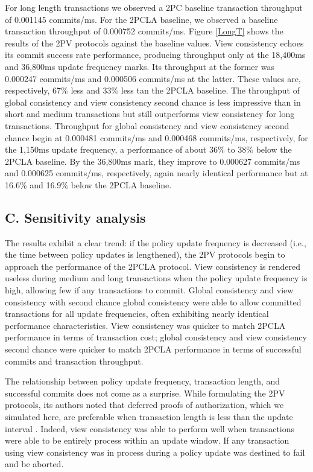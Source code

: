 \documentclass[11pt]{article}
\begin{document}
For long length transactions we observed a 2PC baseline transaction throughput of 0.001145 commits/ms. For the 2PCLA baseline, we observed a baseline transaction throughput of 0.000752 commits/ms. Figure \ref{LongT} shows the results of the 2PV protocols against the baseline values. View consistency echoes its commit success rate performance, producing throughput only at the 18,400ms and 36,800ms update frequency marks. Its throughput at the former was 0.000247 commits/ms and 0.000506 commits/ms at the latter. These values are, respectively, 67\% less and 33\% less tan the 2PCLA baseline. The throughput of global consistency and view consistency second chance is less impressive than in short and medium transactions but still outperforms view consistency for long transactions. Throughput for global consistency and view consistency second chance begin at 0.000481 commits/ms and 0.000468 commits/ms, respectively, for the 1,150ms update frequency, a performance of about 36\% to 38\% below the 2PCLA baseline. By the 36,800ms mark, they improve to 0.000627 commits/ms and 0.000625 commits/ms, respectively, again nearly identical performance but at 16.6\% and 16.9\% below the 2PCLA baseline.
\subsection{C. Sensitivity analysis}
The results exhibit a clear trend: if the policy update frequency is decreased (i.e., the time between policy updates is lengthened), the 2PV protocols begin to approach the performance of the 2PCLA protocol. View consistency is rendered useless during medium and long transactions when the policy update frequency is high, allowing few if any transactions to commit. Global consistency and view consistency with second chance global consistency were able to allow committed transactions for all update frequencies, often exhibiting nearly identical performance characteristics. View consistency was quicker to match 2PCLA performance in terms of transaction cost; global consistency and view consistency second chance were quicker to match 2PCLA performance in terms of successful commits and transaction throughput.

The relationship between policy update frequency, transaction length, and successful commits does not come as a surprise. While formulating the 2PV protocols, its authors noted that deferred proofs of authorization, which we simulated here, are preferable when transaction length is less than the update interval \cite{Iskander}. Indeed, view consistency was able to perform well when transactions were able to be entirely process within an update window. If any transaction using view consistency was in process during a policy update was destined to fail and be aborted.
\end{document}
